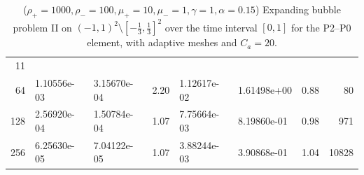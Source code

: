 \begin{table}
\begin{tabular}{rllllllr}
11 \\
 64 & 1.10556e-03 & 3.15670e-04 & 2.20 & 1.12617e-02 & 1.61498e+00 & 0.88 &
80 \\
128 & 2.56920e-04 & 1.50784e-04 & 1.07 & 7.75664e-03 & 8.19860e-01 & 0.98 &
971 \\
256 & 6.25630e-05 & 7.04122e-05 & 1.07 & 3.88244e-03 & 3.90868e-01 & 1.04 &
10828 \\
\hline
\end{tabular}
\hspace*{-3.25cm}
\caption[Navier--Stokes expanding bubble II errors P2--P0]
{($\rho_+ = 1000,\rho_- = 100,\mu_+ = 10,\mu_- =1,\gamma = 1,\alpha=0.15$)
Expanding bubble problem II on $(-1,1)^2\setminus[-\frac{1}{3},\frac{1}{3}]^2$
over the time interval $[0,1]$ for the P2--P0 element, with adaptive
meshes and $C_a=20$\textdegree.}
\label{tab:nsexpandingbubbleIIp2p0}
\end{table}
